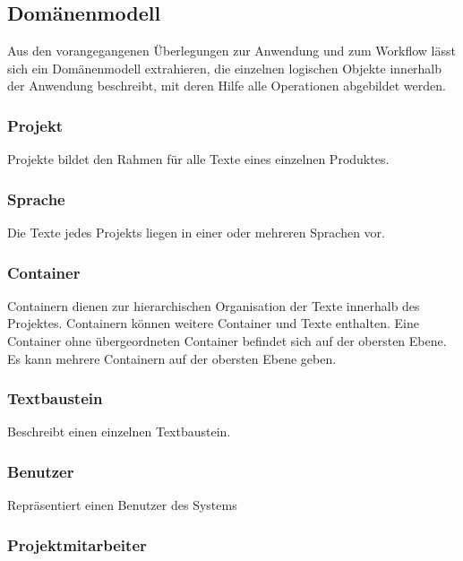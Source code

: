 \subsection{Domänenmodell}\label{l:domänenmodell}

Aus den vorangegangenen Überlegungen zur Anwendung und zum Workflow lässt sich ein Domänenmodell extrahieren, die einzelnen logischen Objekte innerhalb der Anwendung beschreibt, mit deren Hilfe alle Operationen abgebildet werden.

\subsubsection{Projekt}\label{model:projekt}

Projekte bildet den Rahmen für alle Texte eines einzelnen Produktes.

\subsubsection{Sprache}\label{model:sprache}

Die Texte jedes Projekts liegen in einer oder mehreren Sprachen vor.

\subsubsection{Container}\label{model:container}

Containern dienen zur hierarchischen Organisation der Texte innerhalb des Projektes. Containern können weitere Container und Texte enthalten. Eine Container ohne übergeordneten Container befindet sich auf der obersten Ebene. Es kann mehrere Containern auf der obersten Ebene geben.

\subsubsection{Textbaustein}\label{model:textbaustein}

Beschreibt einen einzelnen Textbaustein.

\subsubsection{Benutzer}\label{model:benutzer}

Repräsentiert einen Benutzer des Systems

\subsubsection{Projektmitarbeiter}\label{model:projektmitarbeiter}

